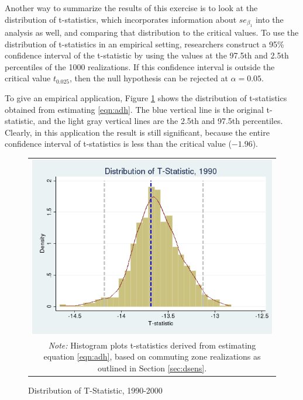 Another way to summarize the results of this exercise is to look at the distribution of t-statistics, which incorporates information about $se_{\beta_1}$ into the analysis as well, and comparing that distribution to the critical values. To use the distribution of t-statistics in an empirical setting, researchers construct a 95\% confidence interval of the t-statistic by using the values at the 97.5th and 2.5th percentiles of the 1000 realizations. If this confidence interval is outside the critical value $t_{0.025}$, then the null hypothesis can be rejected at $\alpha = 0.05$. 

To give an empirical application, Figure \ref{fig:1990_tdist} shows the distribution of t-statistics obtained from estimating \ref{eqn:adh}. The blue vertical line is the original t-statistic, and the light gray vertical lines are the 2.5th and 97.5th percentiles. Clearly, in this application the result is still significant, because the entire confidence interval of t-statistics is less than the critical value ($-1.96$).

\begin{figure}\centering
\caption{Distribution of T-Statistic, 1990-2000 \label{fig:1990_tdist}}
\begin{tabular}{c}
\includegraphics[scale=.5]{./figures/1990_tstat_distribution.png}\\
\multicolumn{1}{p{4.5in}}{\footnotesize \emph{Note:} Histogram plots t-statistics derived from estimating  equation \ref{eqn:adh}, based on commuting zone realizations as outlined in Section \ref{sec:dsens}.}
\end{tabular}
\end{figure}

